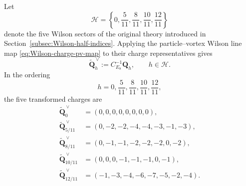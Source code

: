 \documentclass[11pt,a4paper]{article}
\numberwithin{equation}{section}
\begin{document}
Let
\begin{equation}
  \mathcal H
  =\left\{0,\frac5{11},\frac8{11},\frac{10}{11},\frac{12}{11}\right\}
\end{equation}
denote the five Wilson sectors of the original theory introduced in Section~\ref{subsec:Wilson-half-indices}.  Applying the particle--vortex Wilson line map \eqref{eq:Wilson-charge-pv-map} to their charge representatives gives
\begin{equation}
  \widetilde{\boldsymbol Q}_{h}^{\,\vee}
  :=C_{E_8}^{-1}\boldsymbol Q_h,
  \qquad h\in\mathcal H.
  \label{eq:dual-charges-from-pv}
\end{equation}
In the ordering
\begin{equation}
  h=0,\frac5{11},\frac8{11},\frac{10}{11},\frac{12}{11},
\end{equation}
the five transformed charges are
\begin{align}
  \widetilde{\boldsymbol Q}_{0}^{\,\vee}
  &=(0,0,0,0,0,0,0,0),\nonumber\\
  \widetilde{\boldsymbol Q}_{5/11}^{\,\vee}
  &=(0,-2,-2,-4,-4,-3,-1,-3),\nonumber\\
  \widetilde{\boldsymbol Q}_{8/11}^{\,\vee}
  &=(0,-1,-1,-2,-2,-2,0,-2),\nonumber\\
  \widetilde{\boldsymbol Q}_{10/11}^{\,\vee}
  &=(0,0,0,-1,-1,-1,0,-1),\nonumber\\
  \widetilde{\boldsymbol Q}_{12/11}^{\,\vee}
  &=(-1,-3,-4,-6,-7,-5,-2,-4).
  \label{eq:dual-Wilson-charge-list}
\end{align}
\end{document}
